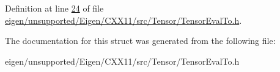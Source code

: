 Definition at line \hyperlink{eigen_2unsupported_2_eigen_2_c_x_x11_2src_2_tensor_2_tensor_eval_to_8h_source_l00024}{24} of file \hyperlink{eigen_2unsupported_2_eigen_2_c_x_x11_2src_2_tensor_2_tensor_eval_to_8h_source}{eigen/unsupported/\+Eigen/\+C\+X\+X11/src/\+Tensor/\+Tensor\+Eval\+To.\+h}.



The documentation for this struct was generated from the following file\+:\begin{DoxyCompactItemize}
\item 
eigen/unsupported/\+Eigen/\+C\+X\+X11/src/\+Tensor/\+Tensor\+Eval\+To.\+h\end{DoxyCompactItemize}

